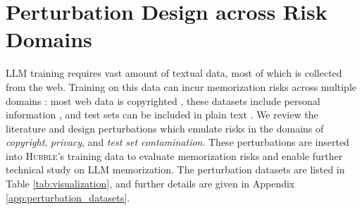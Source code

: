 \section{Perturbation Design across Risk Domains}
\label{sec:systematization}

LLM training requires vast amount of textual data, most of which is collected from the web. Training on this data can incur memorization risks across multiple domains \citep{hartmann2023sokmemorizationgeneralpurposelarge,satvaty2025undesirablememorizationlargelanguage}: most web data is copyrighted \citep{Longpre2024}, these datasets include personal information \citep{hong2025commonpoolprivacyproblems}, and test sets can be included in plain text \citep{jacovi-etal-2023-stop}. We review the literature and design perturbations which emulate risks in the domains of \textit{copyright}, \textit{privacy}, and \textit{test set contamination}. These perturbations are inserted into \textsc{Hubble}'s training data to evaluate memorization risks and enable further technical study on LLM memorization. The perturbation datasets are listed in Table \ref{tab:visualization}, and further details are given in Appendix \ref{app:perturbation_datasets}.

